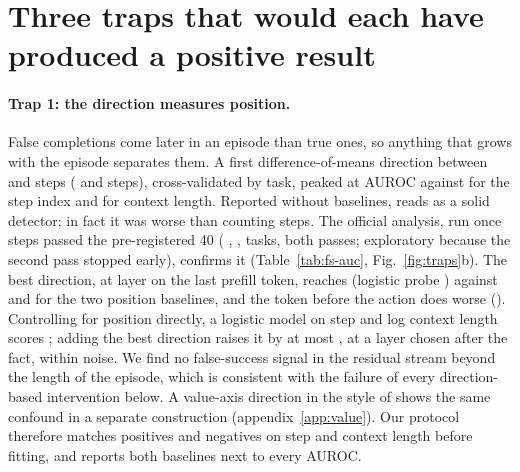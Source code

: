 \section{Three traps that would each have produced a positive result}
\label{sec:traps}


\paragraph{Trap 1: the direction measures position.} False completions come later in an episode than true ones, so anything that grows with the episode separates them. A first difference-of-means direction between \fsp{} and \fsm{} steps (\prvPos{} and \prvNeg{} steps), cross-validated by task, peaked at AUROC \prvAucPost{} against \prvBaseStep{} for the step index and \prvBaseCtx{} for context length. Reported without baselines, \prvAucPost{} reads as a solid detector; in fact it was worse than counting steps. The official analysis, run once \fsp{} steps passed the pre-registered 40 (\ofPos{} \fsp, \ofNeg{} \fsm, \ofTasks{} tasks, both passes; exploratory because the second pass stopped early), confirms it (Table~\ref{tab:fs-auc}, Fig.~\ref{fig:traps}b). The best direction, at layer \ofResidLayer{} on the last prefill token, reaches \ofResidAuc{} (logistic probe \ofResidLr) against \ofBaseStep{} and \ofBaseCtx{} for the two position baselines, and the token before the action does worse (\ofPostAuc). Controlling for position directly, a logistic model on step and log context length scores \ofPosOnly; adding the best direction raises it by at most \ofPosGain, at a layer chosen after the fact, within noise. We find no false-success signal in the residual stream beyond the length of the episode, which is consistent with the failure of every direction-based intervention below. A value-axis direction in the style of \citet{jiang2026value} shows the same confound in a separate construction (appendix~\ref{app:value}). Our protocol therefore matches positives and negatives on step and context length before fitting, and reports both baselines next to every AUROC.


